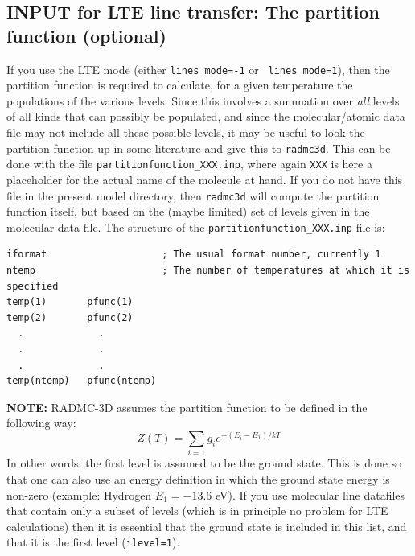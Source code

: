 \documentclass{report}
\newenvironment{asciibox}%
  {\begin{list}{}{%
    \setlength{\topsep}{0.5em}%
    \setlength{\parskip}{0em}%
    \setlength{\parsep}{0em}%
    \setlength{\itemsep}{0em}%
    \setlength{\rightmargin}{0em}%
    \setlength{\leftmargin}{3.0em}%
    \setlength{\labelsep}{1em}%
    \setlength{\labelwidth}{2em}%
  }\normalfont\footnotesize\item}
  {\end{list}}
\begin{document}
\subsection{INPUT for LTE line transfer: The partition function (optional)}
\label{sec-partition-function}
%
If you use the LTE mode (either {\small\tt lines\_mode=-1} or {\small\tt
  lines\_mode=1}), then the partition function is required to calculate, for
a given temperature the populations of the various levels. Since this
involves a summation over {\em all} levels of all kinds that can possibly be
populated, and since the molecular/atomic data file may not include all
these possible levels, it may be useful to look the partition function up in
some literature and give this to {\small\tt radmc3d}. This can be done with
the file {\small\tt partitionfunction\_XXX.inp}, where again {\small\tt XXX}
is here a placeholder for the actual name of the molecule at hand. If you do
not have this file in the present model directory, then {\small\tt radmc3d}
will compute the partition function itself, but based on the (maybe limited)
set of levels given in the molecular data file. The structure of the
{\small\tt partitionfunction\_XXX.inp} file is:
\begin{asciibox}\begin{verbatim}
iformat                    ; The usual format number, currently 1
ntemp                      ; The number of temperatures at which it is specified
temp(1)       pfunc(1)
temp(2)       pfunc(2)
  .             .
  .             .
  .             .
temp(ntemp)   pfunc(ntemp)
\end{verbatim}\end{asciibox}

{\bf NOTE:} RADMC-3D assumes the partition function to be defined in the
following way:
\begin{equation}
Z(T) = \sum_{i=1} g_ie^{-(E_i-E_1)/kT}
\end{equation}
In other words: the first level is assumed to be the ground state. This
is done so that one can also use an energy definition in which the 
ground state energy is non-zero (example: Hydrogen $E_1=-13.6$ eV). If
you use molecular line datafiles that contain only a subset of levels
(which is in principle no problem for LTE calculations) then it is
essential that the ground state is included in this list, and that it is
the first level ({\small\tt ilevel=1}). 
\end{document}
